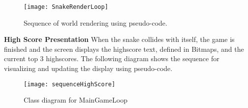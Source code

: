		\begin{figure}[H]
			\texttt{[image: SnakeRenderLoop]}
			\centering
			\caption{Sequence of world rendering using pseudo-code.}
			\label{SnakeRenderLoop}
		\end{figure}
	
	\textbf{High Score Presentation} \newline
		When the snake collides with itself, the game is finished and the screen displays the highscore text, defined in Bitmaps, and the current top 3 highscores. The following diagram shows the sequence for visualizing and updating the display using pseudo-code.
		
			\begin{figure}[H]
				\texttt{[image: sequenceHighScore]}
				\centering
				\caption{Class diagram for MainGameLoop}
				\label{fig:classMain}
			\end{figure}
		




